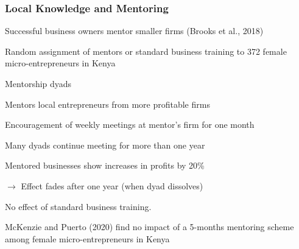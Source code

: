 \documentclass[hideothersubsections, usenames,dvipsnames,11pt]{beamer}
\newenvironment{itemize_2pt}{\itemize\addtolength{\itemsep}{2pt}}{\enditemize}
\begin{document}
\begin{frame}
\frametitle{Local Knowledge and Mentoring}

\begin{itemize_2pt}
	\item Successful business owners mentor smaller firms (\textcolor{camel}{Brooks et al., 2018})
	\begin{itemize_2pt}
		\item Random assignment of mentors or standard business training to 372 female micro-entrepreneurs in Kenya
		\item Mentorship dyads
		\begin{itemize_2pt}
			\item Mentors local entrepreneurs from more profitable firms
			\item \textcolor{bdf}{Encouragement of weekly meetings at mentor's firm for one month}
			\item Many dyads continue meeting for more than one year
		\end{itemize_2pt}
		
		\item Mentored businesses show \textcolor{bdf}{increases in profits by 20\%}
		\item $\rightarrow$ \textcolor{bdf}{Effect fades after one year} (when dyad dissolves)
		\item No effect of standard business training.
		
		\vspace{0.5em}
		
		\item \textcolor{camel}{McKenzie and Puerto (2020)} find no impact of a 5-months mentoring scheme among female micro-entrepreneurs in Kenya
	\end{itemize_2pt}
\end{itemize_2pt}

\end{frame}
\end{document}
